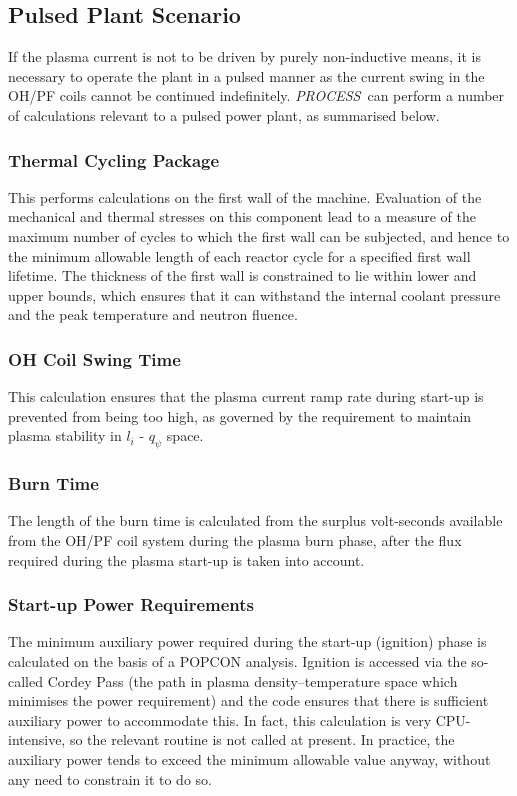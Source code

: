 \documentclass[11pt,a4paper]{report}
\newcommand{\PS}{\mbox{\it PROCESS\/ }}
\begin{document}
\subsection{Pulsed Plant Scenario}

If the plasma current is not to be driven by purely non-inductive means, it is
necessary to operate the plant in a pulsed manner as the current swing in the
OH/PF coils cannot be continued indefinitely. \PS can perform a number of
calculations relevant to a pulsed power plant, as summarised below.

\subsubsection{Thermal Cycling Package}
This performs calculations on the first wall of the machine. Evaluation of the
mechanical and thermal stresses on this component lead to a measure of the
maximum number of cycles to which the first wall can be subjected, and hence
to the minimum allowable length of each reactor cycle for a specified first
wall lifetime. The thickness of the first wall is constrained to lie within
lower and upper bounds, which ensures that it can withstand the internal
coolant pressure and the peak temperature and neutron fluence.

\subsubsection{OH Coil Swing Time}
This calculation ensures that the plasma current ramp rate during start-up is
prevented from being too high, as governed by the requirement to maintain
plasma stability in $l_i$ - $q_\psi$ space.

\subsubsection{Burn Time}
The length of the burn time is calculated from the surplus volt-seconds
available from the OH/PF coil system during the plasma burn phase, after the
flux required during the plasma start-up is taken into account.

\subsubsection{Start-up Power Requirements}
The minimum auxiliary power required during the start-up (ignition) phase is
calculated on the basis of a POPCON analysis. Ignition is accessed via the
so-called Cordey Pass (the path in plasma density--temperature space which
minimises the power requirement) and the code ensures that there is sufficient
auxiliary power to accommodate this. In fact, this calculation is very
CPU-intensive, so the relevant routine is not called at present. In practice,
the auxiliary power tends to exceed the minimum allowable value anyway,
without any need to constrain it to do so.
\end{document}
